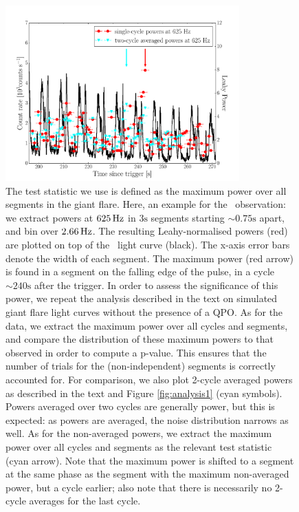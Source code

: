 \documentclass{emulateapj}
\begin{document}
\begin{figure}[htbp]
\begin{center}
\includegraphics[width=9cm]{f2.pdf}
\caption{The test statistic we use is defined as the maximum power over all segments in the giant flare. Here, an example for the \rxte\ observation: we extract powers at $625 \,\mathrm{Hz}$ in $3\mathrm{s}$ segments starting $\sim 0.75 \mathrm{s}$ apart, and bin over $2.66 \,\mathrm{Hz}$. The resulting Leahy-normalised powers (red) are plotted on top of the \rxte\ light curve (black). The x-axis error bars denote the width of each segment. The maximum power (red arrow) is found in a segment on the falling edge of the pulse, in a cycle $\sim 240 \mathrm{s}$ after the trigger. In order to assess the significance of this power, we repeat the analysis described in the text on simulated giant flare light curves without the presence of a QPO. As for the data, we extract the maximum power over all cycles and segments, and compare the distribution of these maximum powers to that observed in order to compute a p-value. This ensures that the number of trials for the (non-independent) segments is correctly accounted for. For comparison, we also plot 2-cycle averaged powers as described in the text and Figure \ref{fig:analysis1} (cyan symbols). Powers averaged over two cycles are generally power, but this is expected: as powers are averaged, the noise distribution narrows as well. As for the non-averaged powers, we extract the maximum power over all cycles and segments as the relevant test statistic (cyan arrow). Note that the maximum power is shifted to a segment at the same phase as the segment with the maximum non-averaged power, but a cycle earlier; also note that there is necessarily no 2-cycle averages for the last cycle. }
\label{fig:teststatistic}
\end{center}
\end{figure}
\end{document}
